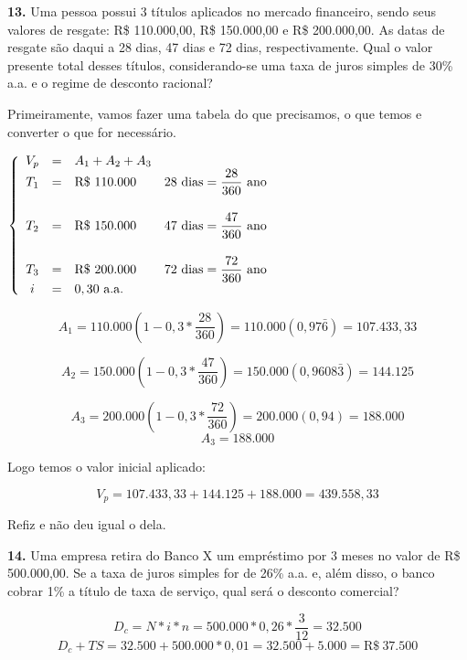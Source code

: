 \documentclass[12pt,a4paper]{article}
\begin{document}
  \textbf{13.} Uma pessoa possui 3 títulos aplicados no mercado financeiro, sendo seus valores
  de resgate: R\$ 110.000,00, R\$ 150.000,00 e R\$ 200.000,00. As datas de resgate são daqui
  a 28 dias, 47 dias e 72 dias, respectivamente. Qual o valor presente total desses títulos,
  considerando-se uma taxa de juros simples de 30\% a.a. e o regime de desconto racional?
  \vspace*{.5cm}

  Primeiramente, vamos fazer uma tabela do que precisamos, o que temos e converter o que for necessário.
  \vspace*{.5cm}

  \( \left\{
  \begin{array}{ccllr}
    V_p & = & A_1 + A_2 + A_3 \\
    \vspace*{.5cm}
    T_1 & = & \text{R\$}\ 110.000 & 28\ \text{dias} = \dfrac{28}{360}\ \text{ano} \\
    \vspace*{.5cm}
    T_2 & = & \text{R\$}\ 150.000 & 47\ \text{dias} = \dfrac{47}{360}\ \text{ano} \\
    T_3 & = & \text{R\$}\ 200.000 & 72\ \text{dias} = \dfrac{72}{360}\ \text{ano} \\    i   & = & 0,30\ \text{a.a.}
  \end{array} \right.
  \)

  \[
    A_1 = 110.000 \left( 1 - 0,3 * \frac{28}{360} \right) = 110.000 ( 0,97\bar{6}) = 107.433,33
  \]

  \[
    A_2 = 150.000 \left( 1 - 0,3 * \frac{47}{360} \right) = 150.000 ( 0,9608\bar{3}) = 144.125
  \]

  \[
    A_3 = 200.000 \left( 1 - 0,3 * \frac{72}{360} \right) = 200.000 (0,94) = 188.000
  \]
  \[
    A_3 = 188.000
  \]

  Logo temos o valor inicial aplicado:

  \[ V_p = 107.433,33 + 144.125 + 188.000 = 439.558,33 \]

  Refiz e não deu igual o dela.
  \vspace*{.5cm}

  \textbf{14.} Uma empresa retira do Banco X um empréstimo por 3 meses no valor de R\$
  500.000,00. Se a taxa de juros simples for de 26\% a.a. e, além disso, o banco cobrar 1\%
  a título de taxa de serviço, qual será o desconto comercial?
  
  \[
    D_c = N * i * n = 500.000*0,26*\frac{3}{12} = 32.500
  \]
  \[
    D_c + TS = 32.500 + 500.000 * 0,01 = 32.500 + 5.000 = \text{R\$}\ 37.500
  \]
\end{document}
